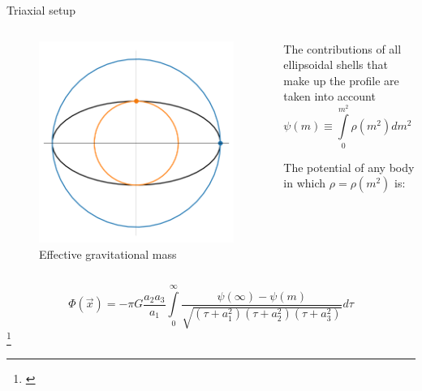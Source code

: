 \documentclass{beamer}
\newcommand\blfootnote[1]
{%
	\begingroup
	\renewcommand\thefootnote{}\footnote{#1}%
	\addtocounter{footnote}{-1}%
	\endgroup
}
\newcommand{\fcite}[1]{\blfootnote{\tiny\cite{#1}}}
\begin{document}
\begin{frame}{Triaxial setup}
	\begin{columns}
		\begin{column}{0.3\linewidth}
			\begin{figure}[h]
				\centering
				\includegraphics[width = \linewidth]{"../Files/Week 7/triaxial_mass_issue"}
				\caption{Effective gravitational mass}
				\label{fig: triaxial_mass_issue}
			\end{figure}
		\end{column}
		\begin{column}{0.7\linewidth}
			The contributions of all ellipsoidal shells that make up the profile are taken into account
			\begin{equation}
				\psi(m) \equiv \int\limits_{0}^{m^2} \rho(m^2)dm^2 = \int\limits_{0}^{k = m^2} \rho(k)dk
			\end{equation}
			
			The potential of any body in which $\rho = \rho(m^2)$ is:
		\end{column}
	\end{columns}
	\begin{equation}\label{eq: generalPotential}
	\Phi(\vec{x}) = -\pi G \dfrac{a_2a_3}{a_1}\int\limits_{0}^{\infty}\dfrac{\psi(\infty) - \psi(m)}{\sqrt{(\tau + a_1^2)(\tau + a_2^2)(\tau + a_3^2)}}d\tau
	\end{equation}
	\fcite{binney2011galactic}
\end{frame}
\end{document}
